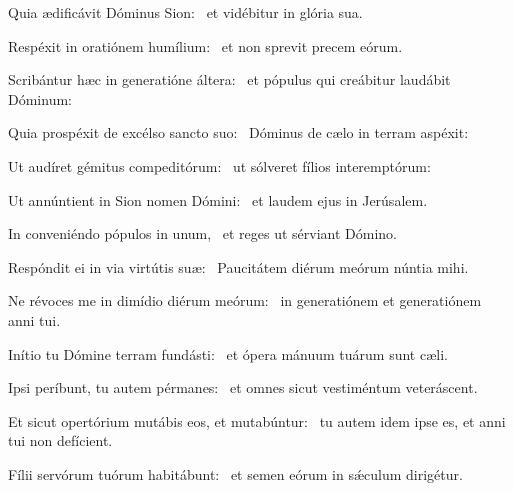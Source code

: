 \item Quia ædificávit Dóminus Sion:~\psstar{} et vidébitur in glória sua.

\item Respéxit in oratiónem humílium:~\psstar{} et non sprevit precem eórum.

\item Scribántur hæc in generatióne áltera:~\psstar{} et pópulus qui creábitur laudábit Dóminum:

\item Quia prospéxit de excélso sancto suo:~\psstar{} Dóminus de cælo in terram aspéxit:

\item Ut audíret gémitus compeditórum:~\psstar{} ut sólveret fílios interemptórum:

\item Ut annúntient in Sion nomen Dómini:~\psstar{} et laudem ejus in Jerúsalem.

\item In conveniéndo pópulos in unum,~\psstar{} et reges ut sérviant Dómino.

\item Respóndit ei in via virtútis suæ:~\psstar{} Paucitátem diérum meórum núntia mihi.

\item Ne révoces me in dimídio diérum meórum:~\psstar{} in generatiónem et generatiónem anni tui.

\item Inítio tu Dómine terram fundásti:~\psstar{} et ópera mánuum tuárum sunt cæli.

\item Ipsi períbunt, tu autem pérmanes:~\psstar{} et omnes sicut vestiméntum veteráscent.

\item Et sicut opertórium mutábis eos, et mutabúntur:~\psstar{} tu autem idem ipse es, et anni tui non defícient.

\item Fílii servórum tuórum habitábunt:~\psstar{} et semen eórum in sǽculum dirigétur.
